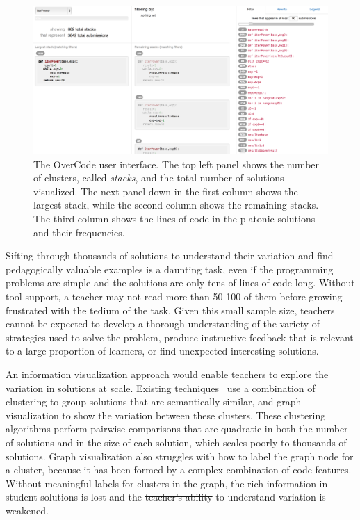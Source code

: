 \documentclass[12pt,twoside]{mitthesis}
\providecommand{\DIFaddtex}[1]{{\protect\color{blue}\uwave{#1}}} %
\providecommand{\DIFdeltex}[1]{{\protect\color{red}\sout{#1}}}                      %
\providecommand{\DIFaddbegin}{} %
\providecommand{\DIFaddend}{} %
\providecommand{\DIFdelbegin}{} %
\providecommand{\DIFdelend}{} %
\providecommand{\DIFadd}[1]{\texorpdfstring{\DIFaddtex{#1}}{#1}} %
\providecommand{\DIFdel}[1]{\texorpdfstring{\DIFdeltex{#1}}{}} %
\begin{document}
\begin{figure}[t!]
\centering
\includegraphics[width=1.0\linewidth]{Body/figures/overcode/interfaceScreenShot.png}
\caption{The OverCode user interface. The top left panel shows the number of clusters, called {\it stacks}, and the total number of solutions visualized. The next panel down in the first column shows the largest stack, while the second column shows the remaining stacks. The third column shows the lines of code in the platonic solutions and their frequencies.}
\label{overcode_fullinterface}
\end{figure}

Sifting through thousands of solutions to understand their variation and find pedagogically valuable examples is a daunting task, even if the programming problems are simple and the solutions are only tens of lines of code long. Without tool support, a teacher may not read more than 50-100 of them before growing frustrated with the tedium of the task. Given this small sample size, teachers cannot be expected to develop a thorough understanding of the variety of strategies used to solve the problem, produce instructive feedback that is relevant to a large proportion of learners, or find unexpected interesting solutions.

An information visualization approach would enable teachers to explore the variation in solutions at scale. Existing techniques~\cite{gradingsigcse14,MOOCshop,codewebs} use a combination of clustering to group solutions that are semantically similar, and graph visualization to show the variation between these clusters. These clustering algorithms perform pairwise comparisons that are quadratic in both the number of solutions and in the size of each solution, which scales poorly to thousands of solutions. Graph visualization also struggles with how to label the graph node for a cluster, because it has been formed by a complex combination of code features. Without meaningful labels for clusters in the graph, the rich information in student solutions is lost and the \DIFdelbegin \DIFdel{teacher's ability }\DIFdelend \DIFaddbegin \DIFadd{ability of the teacher }\DIFaddend to understand variation is weakened.
\end{document}
